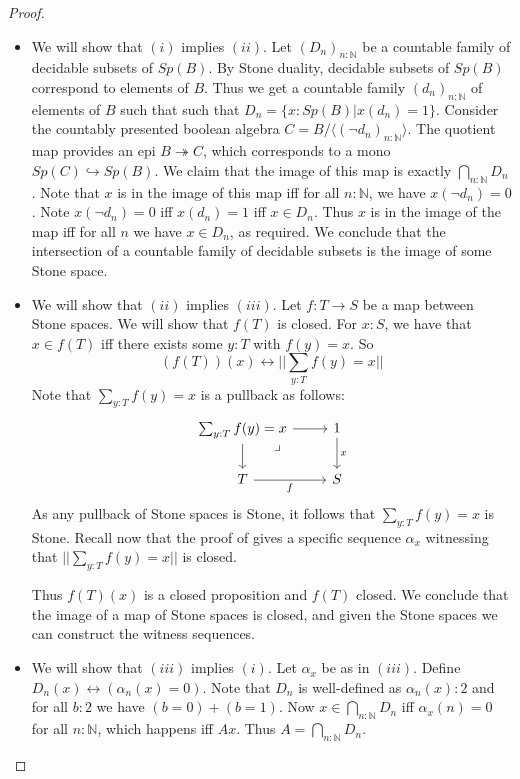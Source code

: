\documentclass{../util/zariski-small}
\begin{document}
\begin{proof}
  \begin{itemize}
    \item We will show that $(i)$ implies $(ii)$.
      Let $(D_n)_{n:\mathbb N}$ be a countable family of decidable subsets of $Sp(B)$. 
      By Stone duality, decidable subsets of $Sp(B)$ correspond to elements of $B$. 
      Thus we get a countable family $(d_n)_{n:\mathbb N}$ of elements of $B$ such that 
      such that $D_n = \{x:Sp(B)| x(d_n) = 1\}$. 
      Consider the countably presented boolean algebra 
      $C = B/\langle (\neg d_n)_{n:\mathbb N}\rangle$.
      The quotient map provides an epi $B\twoheadrightarrow C$, which 
      corresponds to a mono $Sp(C) \hookrightarrow Sp(B)$. 
      We claim that the image of this map is exactly $\bigcap_{n:\mathbb N} D_n$. 
      Note that $x$ is in the image of this map iff for all $n:\mathbb N$, we have 
      $x(\neg d_n) = 0$. Note $x(\neg d_n) = 0$ iff $x (d_n) = 1$ iff $x\in D_n$. 
      Thus $x$ is in the image of the map iff for all $n$ we have $x\in D_n$,
      as required. 
      We conclude that the intersection of a countable family of decidable subsets 
      is the image of some Stone space. 
    \item We will show that $(ii)$ implies $(iii)$.
    Let $f:T\to S$ be a map between Stone spaces. 
    We will show that $f(T)$ is closed. 
    For $x:S$, we have that $x\in f(T)$ iff there exists some $y:T$ 
    with $f(y) = x$. 
    So 
    \begin{equation}
      (f(T))(x) \leftrightarrow || \sum_{y:T} f(y) = x||
    \end{equation}
    Note that $\sum_{y:T} f(y) = x$ is a pullback as follows:
    \begin{equation}
      \begin{tikzcd}
        \sum_{y:T} f(y) = x\arrow[rd,"\lrcorner"{pos=0.125},phantom] \arrow[r] \arrow[d]
        & 1 \arrow[d,"x"] \\
        T \arrow[r,"f"']  & S
      \end{tikzcd}
    \end{equation}
    As any pullback of Stone spaces is Stone, it follows that 
    $\sum_{y:T} f(y) = x$ is Stone.
    Recall now that the proof of  
    gives a specific sequence $\alpha_x$ witnessing that $||\sum_{y:T} f(y) = x||$ is closed. 

    Thus $f(T)(x)$ is a closed proposition and $f(T)$ closed. 
    We conclude that the image of a map of Stone spaces is closed, 
    and given the Stone spaces we can construct the witness sequences. 
  \item We will show that $(iii)$ implies $(i)$. 
    Let $\alpha_x$ be as in $(iii)$. Define 
    $D_n(x) \leftrightarrow (\alpha_n(x) = 0)$. 
    Note that $D_n$ is well-defined as $\alpha_n(x):2$ and for all $b:2$ we have
    $(b=0)+ (b=1)$. Now $x \in \bigcap_{n:\mathbb N} D_n$ iff
    $\alpha_x(n) = 0$ for all $n:\mathbb N$, 
    which happens iff $A x$. Thus $A = \bigcap_{n:\mathbb N} D_n$. 
  \end{itemize} 
\end{proof} 
\end{document}
